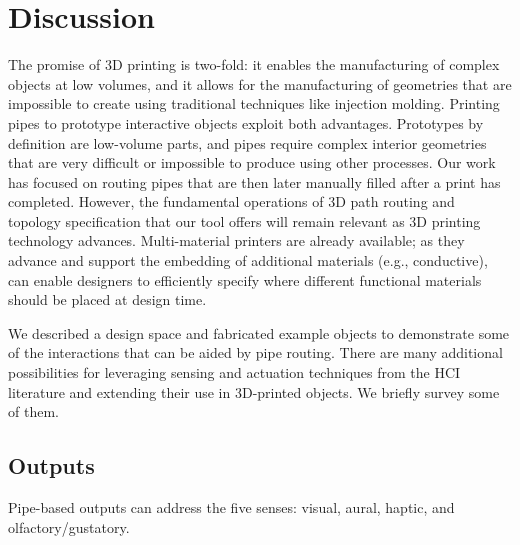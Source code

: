 \section{Discussion}
%

The promise of 3D printing is two-fold: it enables the manufacturing of complex objects at low volumes, and it allows for the manufacturing of geometries that are impossible to create using traditional techniques like injection molding.  Printing pipes to prototype interactive objects exploit both advantages. Prototypes by definition are low-volume parts, and pipes require complex interior geometries that are very difficult or impossible to produce using other processes. Our work has focused on routing pipes that are then later manually filled after a print has completed. However, the fundamental operations of 3D path routing and topology specification that our tool offers will remain relevant as 3D printing technology advances. Multi-material printers are already available; as they advance and support the embedding of additional materials (e.g., conductive), \systemname can enable designers to efficiently specify where different functional materials should be placed at design time.

We described a design space and fabricated example objects to demonstrate some of the interactions that can be aided by pipe routing. There are many additional possibilities for leveraging sensing and actuation techniques from the HCI literature and extending their use in 3D-printed objects. We briefly survey some of them.

\subsection{Outputs}

Pipe-based outputs can address the five senses: visual, aural, haptic, and olfactory/gustatory.  %

